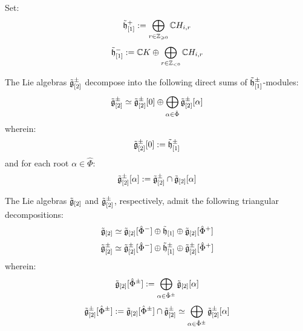         \begin{corollary}
            Set:
                $$\tilde{\mathfrak{h}}_{[1]}^+ := \bigoplus_{r \in \mathbb{Z}_{\geqslant 0}} \mathbb{C} H_{i, r}$$
                $$\tilde{\mathfrak{h}}_{[1]}^- := \mathbb{C} K \oplus \bigoplus_{r \in \mathbb{Z}_{< 0}} \mathbb{C} H_{i, r}$$
        
            The Lie algebras $\tilde{\mathfrak{g}}_{[2]}^{\pm}$ decompose into the following direct sums of $\tilde{\mathfrak{h}}_{[1]}^{\pm}$-modules:
                $$\tilde{\mathfrak{g}}_{[2]}^{\pm} \simeq \tilde{\mathfrak{g}}_{[2]}^{\pm}[0] \oplus \bigoplus_{\alpha \in \hat{\Phi}} \tilde{\mathfrak{g}}_{[2]}^{\pm}[\alpha]$$
            wherein:
                $$\tilde{\mathfrak{g}}_{[2]}^{\pm}[0] := \tilde{\mathfrak{h}}_{[1]}^{\pm}$$
            and for each root $\alpha \in \hat{\Phi}$:
                $$\tilde{\mathfrak{g}}_{[2]}^{\pm}[\alpha] := \tilde{\mathfrak{g}}_{[2]}^{\pm} \cap \tilde{\mathfrak{g}}_{[2]}[\alpha]$$
        \end{corollary}
        \begin{corollary} \label{coro: triangular_decompositions_for_toroidal_lie_algebras}
            The Lie algebras $\tilde{\mathfrak{g}}_{[2]}$ and $\tilde{\mathfrak{g}}_{[2]}^{\pm}$, respectively, admit the following triangular decompositions:
                $$\tilde{\mathfrak{g}}_{[2]} \simeq \tilde{\mathfrak{g}}_{[2]}[\hat{\Phi}^-] \oplus \tilde{\mathfrak{h}}_{[1]} \oplus \tilde{\mathfrak{g}}_{[2]}[\hat{\Phi}^+]$$
                $$\tilde{\mathfrak{g}}_{[2]}^{\pm} \simeq \tilde{\mathfrak{g}}_{[2]}^{\pm}[\hat{\Phi}^-] \oplus \tilde{\mathfrak{h}}_{[1]}^{\pm} \oplus \tilde{\mathfrak{g}}_{[2]}^{\pm}[\hat{\Phi}^+]$$
            wherein:
                $$\tilde{\mathfrak{g}}_{[2]}[\hat{\Phi}^{\pm}] := \bigoplus_{\alpha \in \hat{\Phi}^{\pm}} \tilde{\mathfrak{g}}_{[2]}[\alpha]$$
                $$\tilde{\mathfrak{g}}_{[2]}^{\pm}[\hat{\Phi}^{\pm}] := \tilde{\mathfrak{g}}_{[2]}[\hat{\Phi}^{\pm}] \cap \tilde{\mathfrak{g}}_{[2]}^{\pm} \simeq \bigoplus_{\alpha \in \hat{\Phi}^{\pm}} \tilde{\mathfrak{g}}_{[2]}^{\pm}[\alpha]$$
        \end{corollary}

